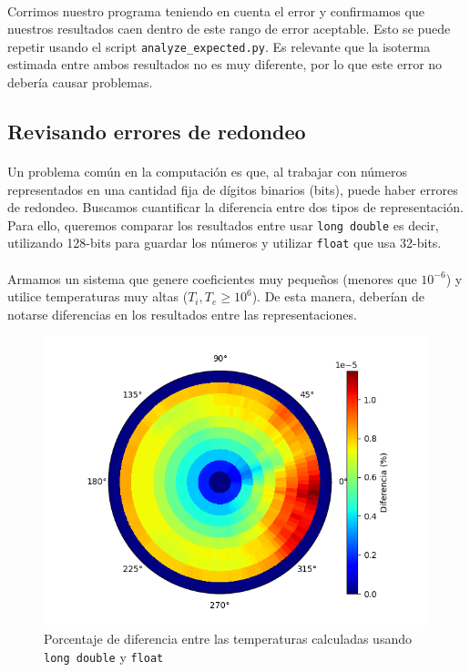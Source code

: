 \documentclass[12pt]{article}
\begin{document}
\paragraph{} Corrimos nuestro programa teniendo en cuenta el error y confirmamos que nuestros resultados caen dentro de este rango de error aceptable. Esto se puede repetir usando el script \texttt{analyze\_expected.py}. Es relevante que la isoterma estimada entre ambos resultados no es muy diferente, por lo que este error no debería causar problemas. %

\subsection{Revisando errores de redondeo}
\label{sec:rounding}

\paragraph{} Un problema común en la computación es que, al trabajar con números representados en una cantidad fija de dígitos binarios (bits), puede haber errores de redondeo. Buscamos cuantificar la diferencia entre dos tipos de representación. Para ello, queremos comparar los resultados entre usar \texttt{long double} es decir, utilizando 128-bits para guardar los números y utilizar \texttt{float} que usa 32-bits. 
\paragraph{} Armamos un sistema que genere coeficientes muy pequeños (menores que \(10^{-6}\)) y utilice temperaturas muy altas (\(T_i, T_e \geq 10^6\)). De esta manera, deberían de notarse diferencias en los resultados entre las representaciones.

\begin{figure}[H]
\centering
\includegraphics[scale=0.5]{rounding.temperature}
\caption{Porcentaje de diferencia entre las temperaturas calculadas usando \texttt{long double} y \texttt{float}}
\label{fig:rounding.diffs}
\end{figure}
\end{document}
